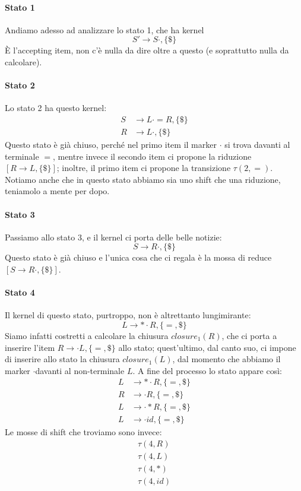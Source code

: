 \documentclass[class=book, crop=false, oneside, 12pt]{standalone}
\begin{document}
\paragraph{Stato 1}
Andiamo adesso ad analizzare lo stato 1, che ha kernel 
\begin{equation*}
    S' \to S\cdot, \{\$\}    
\end{equation*}
È l'accepting item, non c'è nulla da dire oltre a questo (e soprattutto nulla da calcolare).

\paragraph{Stato 2}
Lo stato 2 ha questo kernel:
\begin{align*}
    S &\to L \cdot = R, \{\$\} \\
    R &\to L \cdot, \{\$\}
\end{align*}
Questo stato è già chiuso, perché nel primo item il marker \(\cdot\) si trova davanti al terminale \(=\), mentre invece il secondo item ci propone la riduzione \([R \to L, \{\$\}]\); inoltre, il primo item ci propone la transizione \(\tau(2, =)\). Notiamo anche che in questo stato abbiamo sia uno shift che una riduzione, teniamolo a mente per dopo.

\paragraph{Stato 3}
Passiamo allo stato 3, e il kernel ci porta delle belle notizie:
\begin{equation*}
    S \to R\cdot, \{\$\}    
\end{equation*}
Questo stato è già chiuso e l'unica cosa che ci regala è la mossa di reduce \([S \to R\cdot, \{\$\}]\).

\paragraph{Stato 4}
Il kernel di questo stato, purtroppo, non è altrettanto lungimirante:
\begin{equation*}
    L \to \ast \cdot R, \{=, \$\}
\end{equation*}
Siamo infatti costretti a calcolare la chiusura \(closure_1(R)\), che ci porta a inserire l'item \(R \to \cdot L, \{=, \$\}\) allo stato; quest'ultimo, dal canto suo, ci impone di inserire allo stato la chiusura \(closure_1(L)\), dal momento che abbiamo il marker \(\cdot\)davanti al non-terminale \(L\). A fine del processo lo stato appare così:
\begin{align*}
    L &\to \ast \cdot R, \{=, \$\} \\
    R &\to \cdot R, \{=, \$\} \\
    L &\to \cdot \ast R, \{=, \$\} \\
    L &\to \cdot id, \{=, \$\} 
\end{align*}
Le mosse di shift che troviamo sono invece:
\begin{gather*}
    \tau(4, R) \\
    \tau(4, L) \\
    \tau(4, \ast) \\
    \tau(4, id)
\end{gather*}
\end{document}
